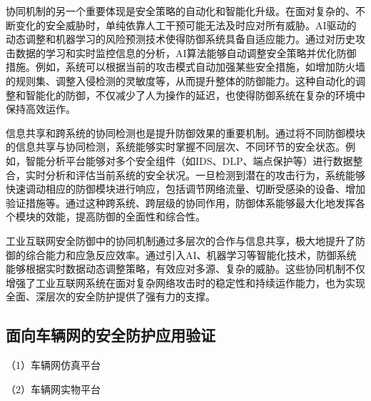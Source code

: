 协同机制的另一个重要体现是安全策略的自动化和智能化升级。在面对复杂的、不断变化的安全威胁时，单纯依靠人工干预可能无法及时应对所有威胁。AI驱动的动态调整和机器学习的风险预测技术使得防御系统具备自适应能力。通过对历史攻击数据的学习和实时监控信息的分析，AI算法能够自动调整安全策略并优化防御措施。例如，系统可以根据当前的攻击模式自动加强某些安全措施，如增加防火墙的规则集、调整入侵检测的灵敏度等，从而提升整体的防御能力。这种自动化的调整和智能化的防御，不仅减少了人为操作的延迟，也使得防御系统在复杂的环境中保持高效运作。

信息共享和跨系统的协同检测也是提升防御效果的重要机制。通过将不同防御模块的信息共享与协同检测，系统能够实时掌握不同层次、不同环节的安全状态。例如，智能分析平台能够对多个安全组件（如IDS、DLP、端点保护等）进行数据整合，实时分析和评估当前系统的安全状况。一旦检测到潜在的攻击行为，系统能够快速调动相应的防御模块进行响应，包括调节网络流量、切断受感染的设备、增加验证措施等。通过这种跨系统、跨层级的协同作用，防御体系能够最大化地发挥各个模块的效能，提高防御的全面性和综合性。

工业互联网安全防御中的协同机制通过多层次的合作与信息共享，极大地提升了防御的综合能力和应急反应效率。通过引入AI、机器学习等智能化技术，防御系统能够根据实时数据动态调整策略，有效应对多源、复杂的威胁。这些协同机制不仅增强了工业互联网系统在面对复杂网络攻击时的稳定性和持续运作能力，也为实现全面、深层次的安全防护提供了强有力的支撑。

\subsection{面向车辆网的安全防护应用验证}

（1）车辆网仿真平台

（2）车辆网实物平台
